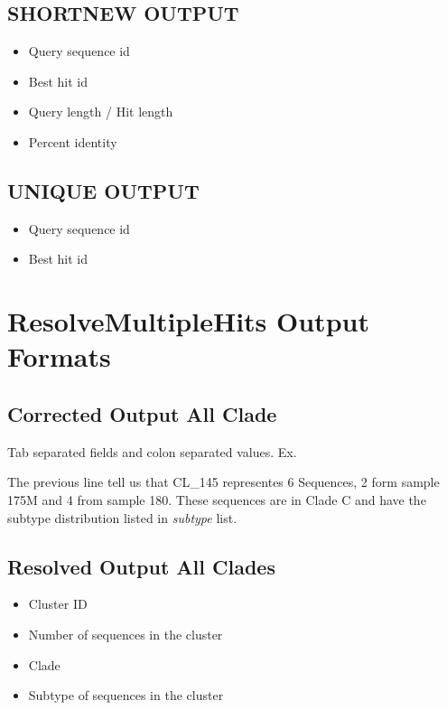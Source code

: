 \documentclass[letterpaper,10pt,english]{sphinxmanual}
\begin{document}
\subsection{SHORTNEW OUTPUT}
\label{defs:shortnewout}\label{defs:shortnew-output}\begin{itemize}
\item {} 
Query sequence id

\item {} 
Best hit id

\item {} 
Query length / Hit length

\item {} 
Percent identity

\end{itemize}


\subsection{UNIQUE OUTPUT}
\label{defs:unique-output}\label{defs:uniqueout}\begin{itemize}
\item {} 
Query sequence id

\item {} 
Best hit id

\end{itemize}


\section{ResolveMultipleHits Output Formats}
\label{defs:resolvemultiplehits-output-formats}

\subsection{Corrected Output All Clade}
\label{defs:correctedall}\label{defs:corrected-output-all-clade}
Tab separated fields and colon separated values. Ex.


The previous line tell us that CL\_145 representes 6 Sequences, 2 form sample 175M and 4 from sample 180. These sequences are in Clade C and have the subtype distribution listed in \emph{subtype} list.


\subsection{Resolved Output All Clades}
\label{defs:resolvedall}\label{defs:resolved-output-all-clades}\begin{itemize}
\item {} 
Cluster ID

\item {} 
Number of sequences in the cluster

\item {} 
Clade

\item {} 
Subtype of sequences in the cluster

\end{itemize}
\end{document}
